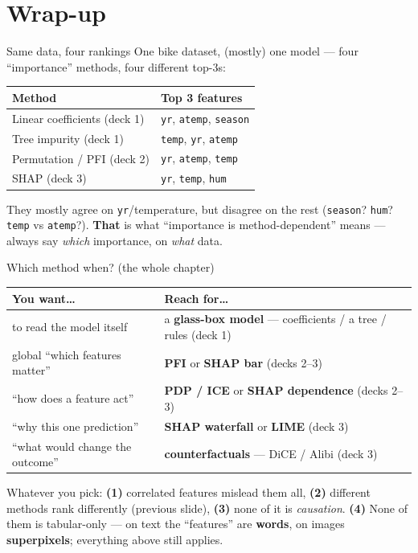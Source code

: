 \documentclass[aspectratio=169]{beamer}
\begin{document}
\section*{Wrap-up}

\begin{frame}{Same data, four rankings}
  One bike dataset, (mostly) one model --- four ``importance'' methods, four different top-3s:
  \vskip 4pt
  \begin{center}\small
    \renewcommand{\arraystretch}{1.3}
    \begin{tabular}{l l}
      \textbf{Method} & \textbf{Top 3 features} \\
      \hline
      Linear coefficients (deck 1) & \texttt{yr}, \texttt{atemp}, \texttt{season} \\
      Tree impurity (deck 1) & \texttt{temp}, \texttt{yr}, \texttt{atemp} \\
      Permutation / PFI (deck 2) & \texttt{yr}, \texttt{atemp}, \texttt{temp} \\
      SHAP (deck 3) & \texttt{yr}, \texttt{temp}, \texttt{hum} \\
      \hline
    \end{tabular}
  \end{center}
  \vskip 4pt
  \footnotesize They mostly agree on \texttt{yr}/temperature, but disagree on the rest
  (\texttt{season}? \texttt{hum}? \texttt{temp} vs \texttt{atemp}?). \textbf{That} is what
  ``importance is method-dependent'' means --- always say \emph{which} importance, on \emph{what} data.
\end{frame}

\begin{frame}{Which method when? (the whole chapter)}
  \begin{center}\small
    \renewcommand{\arraystretch}{1.35}
    \begin{tabular}{p{5.2cm} p{7.2cm}}
      \textbf{You want\dots} & \textbf{Reach for\dots} \\
      \hline
      to read the model itself & a \textbf{glass-box model} --- coefficients / a tree / rules (deck 1) \\
      global ``which features matter'' & \textbf{PFI} or \textbf{SHAP bar} (decks 2--3) \\
      ``how does a feature act'' & \textbf{PDP / ICE} or \textbf{SHAP dependence} (decks 2--3) \\
      ``why this one prediction'' & \textbf{SHAP waterfall} or \textbf{LIME} (deck 3) \\
      ``what would change the outcome'' & \textbf{counterfactuals} --- DiCE / Alibi (deck 3) \\
      \hline
    \end{tabular}
  \end{center}
  \vfill
  \footnotesize Whatever you pick: \textbf{(1)} correlated features mislead them all, \textbf{(2)}
  different methods rank differently (previous slide), \textbf{(3)} none of it is \emph{causation}.
  \textbf{(4)} None of them is tabular-only --- on text the ``features'' are \textbf{words}, on
  images \textbf{superpixels}; everything above still applies.
\end{frame}
\end{document}
